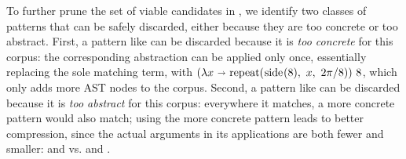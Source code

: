 %
To further prune the set of viable candidates in \tool,
  we identify two classes of patterns that can be safely discarded,
  either because they are
  too concrete or too abstract.
%
First,
  a pattern like
  can be discarded because it is
  \emph{too concrete} for this corpus:
  the corresponding abstraction
  can be applied only once,
  essentially replacing the sole matching term,
  with
    $(\lambda x \bnd \rep{\pSide{8}}{x}{2\pi/8})\ 8$,
  which only adds more AST nodes to the corpus. %
%
%
Second,
  a pattern like
  can be discarded because
  it is \emph{too abstract} for this corpus:
  everywhere it matches,
  a more concrete pattern
  would also match;
  using the more concrete pattern
  leads to better compression,
  since the actual arguments in its applications
  are both fewer and smaller:
     and  vs.
     and .

